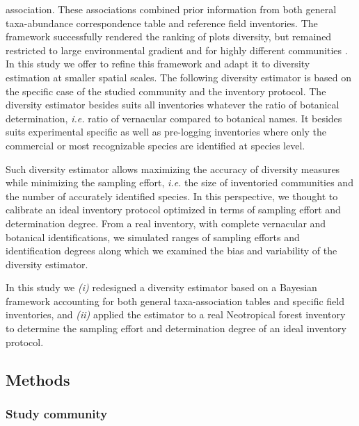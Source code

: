 \documentclass[
  11pt,
  french,
  A4paper,
  extrafontsizes,onecolumn,openright
  ]{memoir}
\begin{document}
association. These associations combined prior information from both
general taxa-abundance correspondence table \autocite{Molino2009} and
reference field inventories. The framework successfully rendered the
ranking of plots diversity, but remained restricted to large
environmental gradient and for highly different communities
\autocites{Guitet2014b}{Guitet2013}. In this study we offer to refine
this framework and adapt it to diversity estimation at smaller spatial
scales. The following diversity estimator is based on the specific case
of the studied community and the inventory protocol. The diversity
estimator besides suits all inventories whatever the ratio of botanical
determination, \emph{i.e.} ratio of vernacular compared to botanical
names. It besides suits experimental specific as well as pre-logging
inventories where only the commercial or most recognizable species are
identified at species level.

Such diversity estimator allows maximizing the accuracy of diversity
measures while minimizing the sampling effort, \emph{i.e.} the size of
inventoried communities and the number of accurately identified species.
In this perspective, we thought to calibrate an ideal inventory protocol
optimized in terms of sampling effort and determination degree. From a
real inventory, with complete vernacular and botanical identifications,
we simulated ranges of sampling efforts and identification degrees along
which we examined the bias and variability of the diversity estimator.

In this study we \emph{(i)} redesigned a diversity estimator based on a
Bayesian framework accounting for both general taxa-association tables
and specific field inventories, and \emph{(ii)} applied the estimator to
a real Neotropical forest inventory to determine the sampling effort and
determination degree of an ideal inventory protocol.

\subsection{Methods}\label{methods}

\subsubsection{Study community}\label{study-community}
\end{document}
